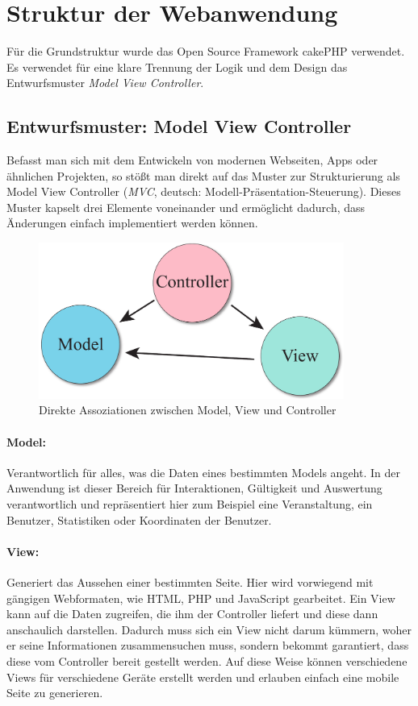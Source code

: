 \section{Struktur der Webanwendung}
Für die Grundstruktur wurde das Open Source Framework cakePHP verwendet. Es verwendet für eine klare Trennung der Logik und dem Design das Entwurfsmuster \emph{Model View Controller}.

\subsection{Entwurfsmuster: Model View Controller}
Befasst man sich mit dem Entwickeln von modernen Webseiten, Apps oder ähnlichen Projekten, so stößt man direkt auf das Muster zur Strukturierung als Model View Controller (\emph{MVC}, deutsch: Modell-Präsentation-Steuerung). Dieses Muster kapselt drei Elemente voneinander und ermöglicht dadurch, dass Änderungen einfach implementiert werden können.

\begin{figure}[!ht]
	\centering
	\includegraphics[width=10cm]{fig/mvc}
	\caption{Direkte Assoziationen zwischen Model, View und Controller}
\end{figure}

\paragraph{Model:}
Verantwortlich für alles, was die Daten eines bestimmten Models angeht. In der Anwendung ist dieser Bereich für Interaktionen, Gültigkeit und Auswertung verantwortlich und repräsentiert hier zum Beispiel eine Veranstaltung, ein Benutzer, Statistiken oder Koordinaten der Benutzer.

\paragraph{View:}
Generiert das Aussehen einer bestimmten Seite. Hier wird vorwiegend mit gängigen Webformaten, wie HTML, PHP und JavaScript gearbeitet. Ein View kann auf die Daten zugreifen, die ihm der Controller liefert und diese dann anschaulich darstellen. Dadurch muss sich ein View nicht darum kümmern, woher er seine Informationen zusammensuchen muss, sondern bekommt garantiert, dass diese vom Controller bereit gestellt werden. Auf diese Weise können verschiedene Views für verschiedene Geräte erstellt werden und erlauben einfach eine mobile Seite zu generieren.

